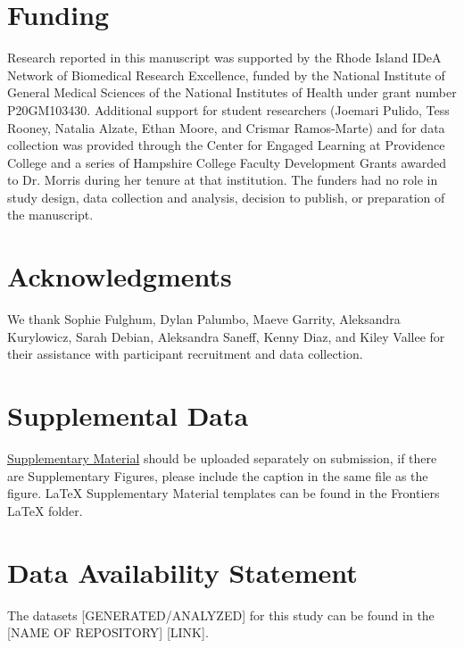 \documentclass[utf8]{FrontiersinHarvard} %
\begin{document}
\section*{Funding}
Research reported in this manuscript was supported by the Rhode Island IDeA Network of Biomedical Research Excellence, funded by the National Institute of General Medical Sciences of the National Institutes of Health under grant number P20GM103430. Additional support for student researchers (Joemari Pulido, Tess Rooney, Natalia Alzate, Ethan Moore, and Crismar Ramos-Marte) and for data collection was provided through the Center for Engaged Learning at Providence College and a series of Hampshire College Faculty Development Grants awarded to Dr. Morris during her tenure at that institution. The funders had no role in study design, data collection and analysis, decision to publish, or preparation of the manuscript.


\section*{Acknowledgments}
We thank Sophie Fulghum, Dylan Palumbo, Maeve Garrity, Aleksandra Kurylowicz, Sarah Debian, Aleksandra Saneff, Kenny Diaz, and Kiley Vallee for their assistance with participant recruitment and data collection.

\section*{Supplemental Data}
 \href{http://home.frontiersin.org/about/author-guidelines#SupplementaryMaterial}{Supplementary Material} should be uploaded separately on submission, if there are Supplementary Figures, please include the caption in the same file as the figure. LaTeX Supplementary Material templates can be found in the Frontiers LaTeX folder.

\section*{Data Availability Statement}
The datasets [GENERATED/ANALYZED] for this study can be found in the [NAME OF REPOSITORY] [LINK].


\end{document}
